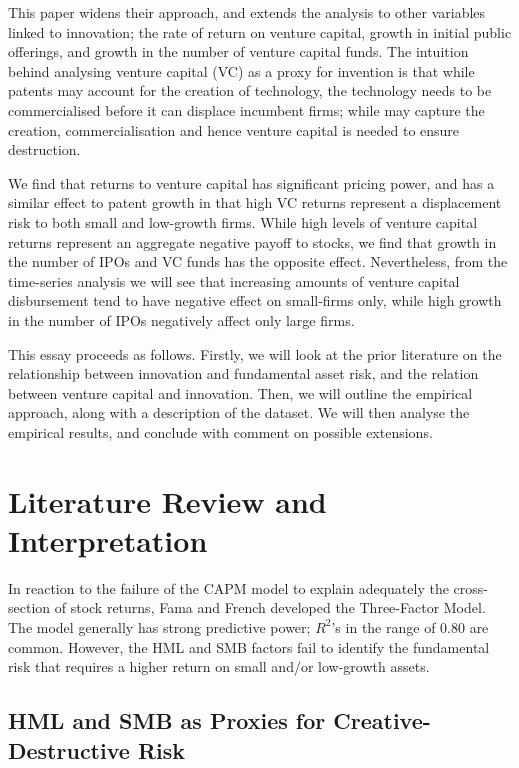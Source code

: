 \documentclass[12pt]{article}
\begin{document}
This paper widens their approach, and extends the analysis to other variables linked to innovation; the rate of return on venture capital, growth in initial public offerings, and growth in the number of venture capital funds. The intuition behind analysing venture capital (VC) as a proxy for invention is that while patents may account for the creation of technology, the technology needs to be commercialised before it can displace incumbent firms; while \cite{grammig2010} may capture the creation, commercialisation and hence venture capital is needed to ensure destruction.

We find that returns to venture capital has significant pricing power, and has a similar effect to patent growth in that high VC returns represent a displacement risk to both small and low-growth firms. While high levels of venture capital returns represent an aggregate negative payoff to stocks, we find that growth in the number of IPOs and VC funds has the opposite effect. Nevertheless, from the time-series analysis we will see that increasing amounts of venture capital disbursement tend to have negative effect on small-firms only, while high growth in the number of IPOs negatively affect only large firms.

This essay proceeds as follows. Firstly, we will look at the prior literature on the relationship between innovation and fundamental asset risk, and the relation between venture capital and innovation. Then, we will outline the empirical approach, along with a description of the dataset.  We will then analyse the empirical results, and conclude with comment on possible extensions.

\section{Literature Review and Interpretation}


		In reaction to the failure of the CAPM model to explain adequately the cross-section of stock returns, Fama and French developed the Three-Factor Model. The model generally has strong predictive power; $R^2$'s in the range of 0.80 are common.  However, the HML and SMB factors fail to identify the fundamental risk that requires a higher return on small and/or low-growth assets.

		\subsection{HML and SMB as Proxies for Creative-Destructive Risk}  
\end{document}
